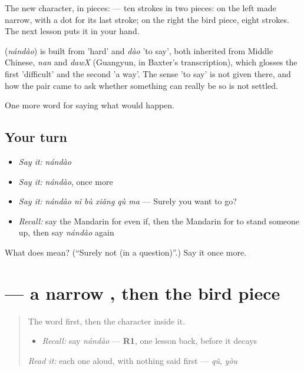 The new character, in pieces:  — ten strokes in two pieces: on the left  made narrow, with a dot for its last stroke; on the right the bird piece, eight strokes. The next lesson puts it in your hand.

\begin{cousinweb}
\textbf{} (\emph{nándào}) is built from  'hard' and \emph{dào} 'to say', both inherited from Middle Chinese, \emph{nan} and \emph{dawX} (Guangyun, in Baxter's transcription), which glosses the first 'difficult' and the second 'a way'. The sense 'to say' is not given there, and how the pair came to ask whether something can really be so is not settled.
\end{cousinweb}

\begin{grammarlens}[title={What you've built}]
One more word for saying what would happen.
\end{grammarlens}

\subsection*{Your turn}
\begin{itemize}
\raggedright
  \item \emph{Say it:} \emph{nándào}
  \item \emph{Say it:} \emph{nándào}, once more
  \item \emph{Say it:} \emph{nándào nǐ bù xiǎng qù ma} — Surely you want to go?
  \item \emph{Recall:} say the Mandarin for even if, then the Mandarin for to stand someone up, then say \emph{nándào} again
\end{itemize}

\begin{tcolorbox}[breakable,colback=teal!4,colframe=teal!35!black,title={Before you move on}]
What does  mean? (\textquotedblleft{}Surely not (in a question)\textquotedblright{}.) Say it once more.
\end{tcolorbox}
\section[\texorpdfstring{\zh{难} (nán)}{难 (nán)}]{ — a narrow , then the bird piece}

\label{lesson:ZH-W397-nan-hard}



\begin{quote}
The word first, then the character inside it.

\begin{itemize}
\raggedright
  \item \emph{Recall:} say \emph{nándào} — \textbf{R1}, one lesson back, before it decays
\end{itemize}

\begin{quote}
 
\end{quote}

\emph{Read it:} each one aloud, with nothing said first — \emph{qǔ}, \emph{yòu}
\end{quote}

